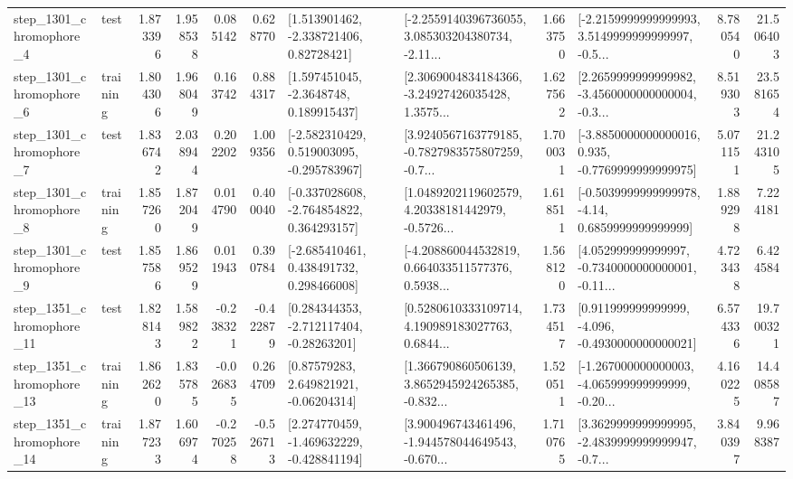 \begin{tabular}{llrrrrllrlrr}
  step\_1301\_chromophore\_4 &      test &      1.873396 &    1.958538 &      0.085142 &  0.628770 &     [1.513901462, -2.338721406, 0.82728421] &  [-2.2559140396736055, 3.085303204380734, -2.11... &       1.663750 &  [-2.2159999999999993, 3.5149999999999997, -0.5... &            8.780540 &         21.506403 \\
  step\_1301\_chromophore\_6 &  training &      1.804306 &    1.968049 &      0.163742 &  0.884317 &      [1.597451045, -2.3648748, 0.189915437] &  [2.3069004834184366, -3.24927426035428, 1.3575... &       1.627562 &  [2.2659999999999982, -3.4560000000000004, -0.3... &            8.519303 &         23.581654 \\
  step\_1301\_chromophore\_7 &      test &      1.836742 &    2.038944 &      0.202202 &  1.009356 &   [-2.582310429, 0.519003095, -0.295783967] &  [3.9240567163779185, -0.7827983575807259, -0.7... &       1.700031 &  [-3.8850000000000016, 0.935, -0.7769999999999975] &            5.071151 &         21.243105 \\
  step\_1301\_chromophore\_8 &  training &      1.857260 &    1.872049 &      0.014790 &  0.400040 &   [-0.337028608, -2.764854822, 0.364293157] &  [1.0489202119602579, 4.20338181442979, -0.5726... &       1.618511 &   [-0.5039999999999978, -4.14, 0.6859999999999999] &            1.889298 &          7.224181 \\
  step\_1301\_chromophore\_9 &      test &      1.857586 &    1.869529 &      0.011943 &  0.390784 &    [-2.685410461, 0.438491732, 0.298466008] &  [-4.208860044532819, 0.664033511577376, 0.5938... &       1.568120 &  [4.052999999999997, -0.7340000000000001, -0.11... &            4.723438 &          6.424584 \\
 step\_1351\_chromophore\_11 &      test &      1.828143 &    1.589822 &     -0.238321 & -0.422879 &    [0.284344353, -2.712117404, -0.28263201] &  [0.5280610333109714, 4.190989183027763, 0.6844... &       1.734517 &   [0.911999999999999, -4.096, -0.4930000000000021] &            6.574336 &         19.700321 \\
 step\_1351\_chromophore\_13 &  training &      1.862620 &    1.835785 &     -0.026835 &  0.264709 &      [0.87579283, 2.649821921, -0.06204314] &  [1.366790860506139, 3.8652945924265385, -0.832... &       1.520511 &  [-1.267000000000003, -4.065999999999999, -0.20... &            4.160225 &         14.408587 \\
 step\_1351\_chromophore\_14 &  training &      1.877233 &    1.606974 &     -0.270258 & -0.526713 &   [2.274770459, -1.469632229, -0.428841194] &  [3.900496743461496, -1.944578044649543, -0.670... &       1.710765 &  [3.3629999999999995, -2.4839999999999947, -0.7... &            3.840397 &          9.968387 \\

\end{tabular}
